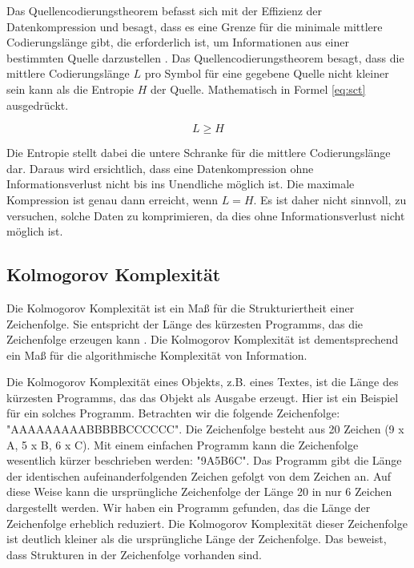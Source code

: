\documentclass[conference]{IEEEtran}
\begin{document}
Das Quellencodierungstheorem befasst sich mit der Effizienz der Datenkompression 
und besagt, dass es eine Grenze für die minimale mittlere Codierungslänge gibt, 
die erforderlich ist, um Informationen aus einer bestimmten Quelle 
darzustellen \cite{sharma}. 
Das Quellencodierungstheorem besagt, dass die mittlere Codierungslänge $L$ pro Symbol
für eine gegebene Quelle nicht kleiner sein kann als die Entropie $H$ der Quelle.
Mathematisch in Formel \ref{eq:sct} ausgedrückt.

\begin{equation}
  \label{eq:sct}
  L \ge H
\end{equation}

Die Entropie stellt dabei die untere Schranke für die mittlere Codierungslänge dar.
Daraus wird ersichtlich, dass eine Datenkompression ohne Informationsverlust 
nicht bis ins Unendliche möglich ist. 
Die maximale Kompression ist genau dann erreicht, wenn $L = H$.
Es ist daher nicht sinnvoll, zu versuchen, solche Daten zu komprimieren, da 
dies ohne Informationsverlust nicht möglich ist.


\subsection{Kolmogorov Komplexität}

Die Kolmogorov Komplexität ist ein Maß für die Strukturiertheit einer Zeichenfolge.
Sie entspricht der Länge des kürzesten Programms, das die Zeichenfolge 
erzeugen kann \cite{li}. 
Die Kolmogorov Komplexität ist dementsprechend ein Maß für die algorithmische Komplexität
von Information.

Die Kolmogorov Komplexität eines Objekts, z.B. eines Textes, ist die Länge des kürzesten 
Programms, das das Objekt als Ausgabe erzeugt. 
Hier ist ein Beispiel für ein solches Programm. 
Betrachten wir die folgende Zeichenfolge: "AAAAAAAAABBBBBCCCCCC". 
Die Zeichenfolge besteht aus 20 Zeichen (9 x A, 5 x B, 6 x C). 
Mit einem einfachen Programm kann die Zeichenfolge wesentlich kürzer beschrieben 
werden: "9A5B6C". 
Das Programm gibt die Länge der identischen aufeinanderfolgenden Zeichen 
gefolgt von dem Zeichen an. 
Auf diese Weise kann die ursprüngliche Zeichenfolge der Länge 20 in nur 6 
Zeichen dargestellt werden. 
Wir haben ein Programm gefunden, das die Länge der Zeichenfolge erheblich reduziert. 
Die Kolmogorov Komplexität dieser Zeichenfolge ist deutlich kleiner als die 
ursprüngliche Länge der Zeichenfolge. 
Das beweist, dass Strukturen in der Zeichenfolge vorhanden sind.
\end{document}
